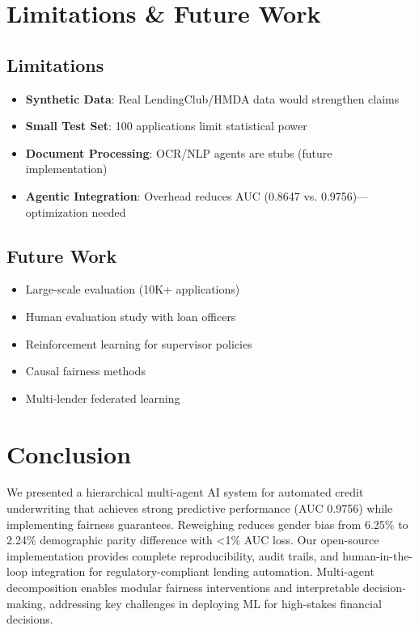 \documentclass[11pt]{article}
\begin{document}
\section{Limitations \& Future Work}

\subsection{Limitations}

\begin{itemize}
    \item \textbf{Synthetic Data}: Real LendingClub/HMDA data would strengthen claims
    \item \textbf{Small Test Set}: 100 applications limit statistical power
    \item \textbf{Document Processing}: OCR/NLP agents are stubs (future implementation)
    \item \textbf{Agentic Integration}: Overhead reduces AUC (0.8647 vs. 0.9756)---optimization needed
\end{itemize}

\subsection{Future Work}

\begin{itemize}
    \item Large-scale evaluation (10K+ applications)
    \item Human evaluation study with loan officers
    \item Reinforcement learning for supervisor policies
    \item Causal fairness methods
    \item Multi-lender federated learning
\end{itemize}

\section{Conclusion}

We presented a hierarchical multi-agent AI system for automated credit underwriting that achieves strong predictive performance (AUC 0.9756) while implementing fairness guarantees. Reweighing reduces gender bias from 6.25\% to 2.24\% demographic parity difference with <1\% AUC loss. Our open-source implementation provides complete reproducibility, audit trails, and human-in-the-loop integration for regulatory-compliant lending automation. Multi-agent decomposition enables modular fairness interventions and interpretable decision-making, addressing key challenges in deploying ML for high-stakes financial decisions.



\end{document}
